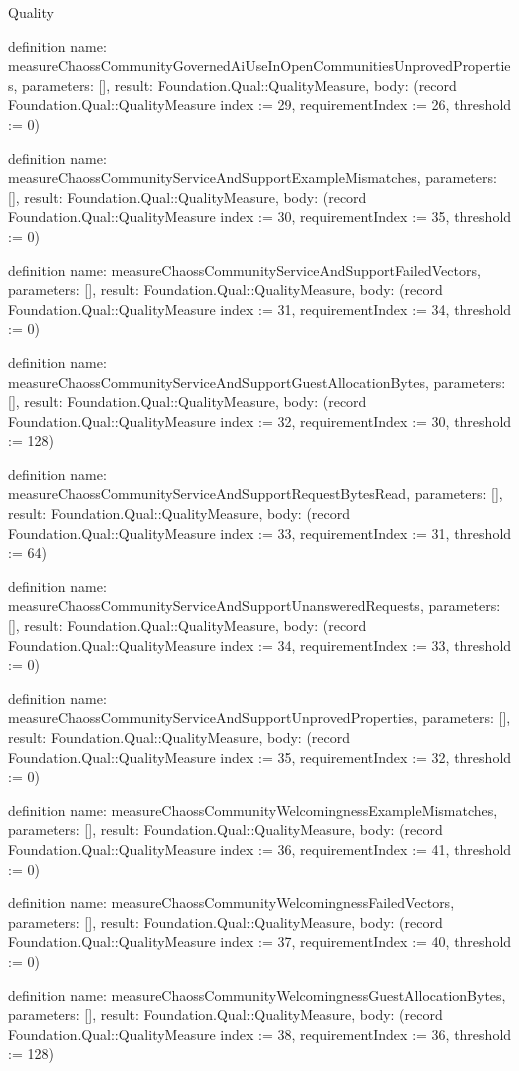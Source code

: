 \begin{lexlean}{Quality}
\begin{semanticmodule}
definition{
  name: measureChaossCommunityGovernedAiUseInOpenCommunitiesUnprovedProperties,
  parameters: [],
  result: Foundation.Qual::QualityMeasure,
  body: (record Foundation.Qual::QualityMeasure {index := 29, requirementIndex := 26, threshold := 0})
}

definition{
  name: measureChaossCommunityServiceAndSupportExampleMismatches,
  parameters: [],
  result: Foundation.Qual::QualityMeasure,
  body: (record Foundation.Qual::QualityMeasure {index := 30, requirementIndex := 35, threshold := 0})
}

definition{
  name: measureChaossCommunityServiceAndSupportFailedVectors,
  parameters: [],
  result: Foundation.Qual::QualityMeasure,
  body: (record Foundation.Qual::QualityMeasure {index := 31, requirementIndex := 34, threshold := 0})
}

definition{
  name: measureChaossCommunityServiceAndSupportGuestAllocationBytes,
  parameters: [],
  result: Foundation.Qual::QualityMeasure,
  body: (record Foundation.Qual::QualityMeasure {index := 32, requirementIndex := 30, threshold := 128})
}

definition{
  name: measureChaossCommunityServiceAndSupportRequestBytesRead,
  parameters: [],
  result: Foundation.Qual::QualityMeasure,
  body: (record Foundation.Qual::QualityMeasure {index := 33, requirementIndex := 31, threshold := 64})
}

definition{
  name: measureChaossCommunityServiceAndSupportUnansweredRequests,
  parameters: [],
  result: Foundation.Qual::QualityMeasure,
  body: (record Foundation.Qual::QualityMeasure {index := 34, requirementIndex := 33, threshold := 0})
}

definition{
  name: measureChaossCommunityServiceAndSupportUnprovedProperties,
  parameters: [],
  result: Foundation.Qual::QualityMeasure,
  body: (record Foundation.Qual::QualityMeasure {index := 35, requirementIndex := 32, threshold := 0})
}

definition{
  name: measureChaossCommunityWelcomingnessExampleMismatches,
  parameters: [],
  result: Foundation.Qual::QualityMeasure,
  body: (record Foundation.Qual::QualityMeasure {index := 36, requirementIndex := 41, threshold := 0})
}

definition{
  name: measureChaossCommunityWelcomingnessFailedVectors,
  parameters: [],
  result: Foundation.Qual::QualityMeasure,
  body: (record Foundation.Qual::QualityMeasure {index := 37, requirementIndex := 40, threshold := 0})
}

definition{
  name: measureChaossCommunityWelcomingnessGuestAllocationBytes,
  parameters: [],
  result: Foundation.Qual::QualityMeasure,
  body: (record Foundation.Qual::QualityMeasure {index := 38, requirementIndex := 36, threshold := 128})
}


\end{semanticmodule}
\end{lexlean}
